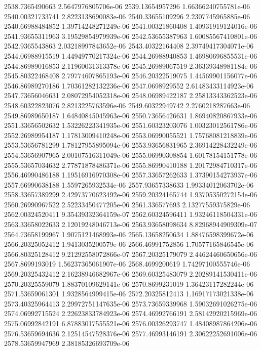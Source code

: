 {2538.7365490663 2.5647976805706e-06
2539.13654957296 1.66366240755781e-06
2540.00321733741 2.8223138690083e-06
2540.33655109296 2.2307745965885e-06
2540.66988484852 1.39714248271249e-06
2541.00321860408 1.40931919124016e-06
2541.93655311963 3.19529854979939e-06
2542.53655387963 1.60085567410801e-06
2542.9365543863 2.03218997843652e-06
2543.40322164408 2.39749417304071e-06
2544.06988915519 1.44949770217324e-06
2544.26988940853 1.46980696855531e-06
2544.86989016853 2.11960031313378e-06
2545.26989067519 2.36339348981184e-06
2545.80322468408 2.79774607865193e-06
2546.20322519075 1.44569901156077e-06
2546.86989270186 1.70361282132236e-06
2547.0698929552 2.61483433114923e-06
2547.73656046631 2.08072954052318e-06
2548.06989422187 2.25813343362523e-06
2548.60322823076 2.8213225763596e-06
2549.60322949742 2.2760218287663e-06
2549.86989650187 1.64840845045963e-06
2550.73656426631 1.86940820867933e-06
2551.33656502632 1.53226223341935e-06
2551.60323203076 1.00323012561786e-06
2552.26989954187 1.17813009410248e-06
2553.06990055521 1.75768081218839e-06
2553.53656781299 1.78127955895094e-06
2553.93656831965 2.36914228432249e-06
2554.53656907965 2.00107516311049e-06
2555.06990308854 1.60178154151778e-06
2555.53657034632 2.77871878486371e-06
2555.86990410188 1.20172984710317e-06
2556.46990486188 1.19516916970308e-06
2557.33657262633 1.37390154273937e-06
2557.66990638188 1.5597265932534e-06
2557.93657338633 1.99334012063702e-06
2558.33657389299 2.42973770623492e-06
2559.20324165744 1.93705350272154e-06
2560.26990967522 2.52233450477205e-06
2561.336577693 2.13277559375829e-06
2562.00324520411 9.35439332364159e-07
2562.60324596411 1.93246118504331e-06
2563.33658022633 2.12019248046713e-06
2563.93658098634 8.82968944909309e-07
2564.73658199967 1.9075121468993e-06
2565.13658250634 1.88476598399672e-06
2566.20325052412 1.9413035200579e-06
2566.46991752856 1.70577165846545e-06
2566.80325128412 9.21292558072866e-07
2567.20325179079 2.44624460650656e-06
2567.8699193019 1.56237365061907e-06
2568.4699200619 1.74297100555746e-06
2569.20325432412 2.16238946682967e-06
2569.60325483079 2.20289141530411e-06
2570.20325559079 1.88370109629141e-06
2570.8699231019 1.36423117282244e-06
2571.53659061301 1.9328564999415e-06
2572.20325812413 1.16917173021338e-06
2573.40325964413 2.29972751147635e-06
2573.73659339968 1.59032691026275e-06
2574.06992715524 2.22623833784923e-06
2574.46992766191 2.58142920215969e-06
2575.06992842191 6.87883017555521e-06
2576.00326293747 1.48408987864206e-06
2576.53659694636 2.12514547528376e-06
2577.46993146191 2.30622252691006e-06
2578.53659947969 2.38185326693709e-06
}
